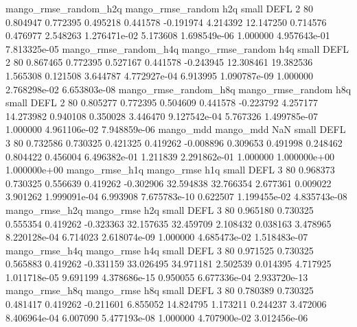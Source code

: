 mango_rmse_random_h2q mango_rmse_random                  h2q      small     DEFL                 2 80 0.804947       0.772395 0.495218       0.441578   -0.191974      4.214392     12.147250     0.714576       0.476977  2.548263 1.276471e-02     5.173608   1.698549e-06            1.000000    4.957643e-01        7.813325e-05
mango_rmse_random_h4q mango_rmse_random                  h4q      small     DEFL                 2 80 0.867465       0.772395 0.527167       0.441578   -0.243945     12.308461     19.382536     1.565308       0.121508  3.644787 4.772927e-04     6.913995   1.090787e-09            1.000000    2.768298e-02        6.653803e-08
mango_rmse_random_h8q mango_rmse_random                  h8q      small     DEFL                 2 80 0.805277       0.772395 0.504609       0.441578   -0.223792      4.257177     14.273982     0.940108       0.350028  3.446470 9.127542e-04     5.767326   1.499785e-07            1.000000    4.961106e-02        7.948859e-06
            mango_mdd         mango_mdd                  NaN      small     DEFL                 3 80 0.732586       0.730325 0.421325       0.419262   -0.008896      0.309653      0.491998     0.248462       0.804422  0.456004 6.496382e-01     1.211839   2.291862e-01            1.000000    1.000000e+00        1.000000e+00
       mango_rmse_h1q        mango_rmse                  h1q      small     DEFL                 3 80 0.968373       0.730325 0.556639       0.419262   -0.302906     32.594838     32.766354     2.677361       0.009022  3.901262 1.999091e-04     6.993908   7.675783e-10            0.622507    1.199455e-02        4.835743e-08
       mango_rmse_h2q        mango_rmse                  h2q      small     DEFL                 3 80 0.965180       0.730325 0.555354       0.419262   -0.323363     32.157635     32.459709     2.108432       0.038163  3.478965 8.220128e-04     6.714023   2.618074e-09            1.000000    4.685473e-02        1.518483e-07
       mango_rmse_h4q        mango_rmse                  h4q      small     DEFL                 3 80 0.971525       0.730325 0.565883       0.419262   -0.331159     33.026495     34.971181     2.502539       0.014395  4.717925 1.011718e-05     9.691199   4.378686e-15            0.950055    6.677336e-04        2.933720e-13
       mango_rmse_h8q        mango_rmse                  h8q      small     DEFL                 3 80 0.780389       0.730325 0.481417       0.419262   -0.211601      6.855052     14.824795     1.173211       0.244237  3.472006 8.406964e-04     6.007090   5.477193e-08            1.000000    4.707900e-02        3.012456e-06
